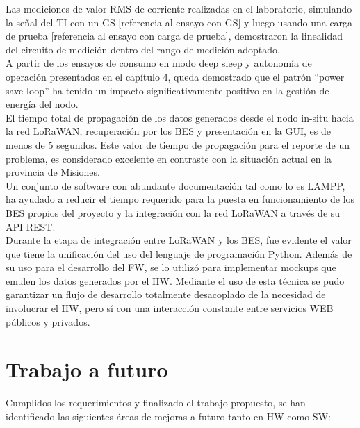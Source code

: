 Las mediciones de valor RMS de corriente realizadas en el laboratorio, simulando la señal del TI con un GS [referencia al ensayo con GS] y luego usando una carga de prueba [referencia al ensayo con carga de prueba], demostraron la linealidad del circuito de medición dentro del rango de medición adoptado.\\
A partir de los ensayos de consumo en modo deep sleep y autonomía de operación presentados en el capítulo 4, queda demostrado que el patrón “power save loop” ha tenido un impacto significativamente positivo en la gestión de energía del nodo.\\
El tiempo total de propagación de los datos generados desde el nodo in-situ hacia la red LoRaWAN, recuperación por los BES y presentación en la GUI, es de menos de 5 segundos. Este valor de tiempo de propagación para el reporte de un problema, es considerado excelente en contraste con la situación actual en la provincia de Misiones.\\
Un conjunto de software con abundante documentación tal como lo es LAMPP, ha ayudado a reducir el tiempo requerido para la puesta en funcionamiento de los BES propios del proyecto y la integración con la red LoRaWAN a través de su API REST.\\
Durante la etapa de integración entre LoRaWAN y los BES, fue evidente el valor que tiene la unificación del uso del lenguaje de programación Python. Además de su uso para el desarrollo del FW, se lo utilizó para implementar mockups que emulen los datos generados por el HW. Mediante el uso de esta técnica se pudo garantizar un flujo de desarrollo totalmente desacoplado de la necesidad de involucrar el HW, pero sí con una interacción constante entre servicios WEB públicos y privados.\\


\section{Trabajo a futuro}

Cumplidos los requerimientos y finalizado el trabajo propuesto, se han identificado las siguientes áreas de mejoras a futuro tanto en HW como SW:

